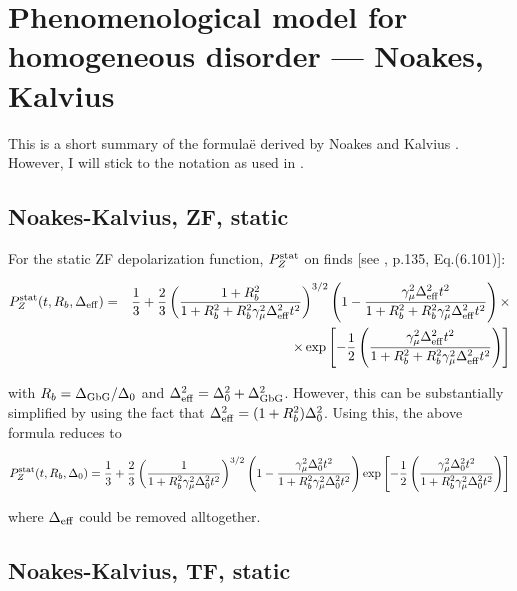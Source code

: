 \documentclass[a4paper,10pt]{article}
\begin{document}
\section*{Phenomenological model for homogeneous disorder --- Noakes, Kalvius}

\noindent This is a short summary of the formula\"{e} derived by Noakes and
Kalvius \cite{noakes97,noakes99}. However, I will stick to the notation as used
in \cite{yaouanc11}.

\subsection*{Noakes-Kalvius, ZF, static}

\noindent For the static ZF depolarization function, $P_{Z}^{\rm stat}$ on finds [see \cite{yaouanc11}, p.135, Eq.(6.101)]:

\begin{eqnarray*}
 P_{Z}^{\rm stat}(t, R_b, \Delta_{\rm eff}) &=& \frac{1}{3} + \frac{2}{3} \left(\frac{1+R_b^2}{1+R_b^2+R_b^2 \gamma_\mu^2 \Delta_{\rm eff}^2 t^2}\right)^{3/2}
  \left(1-\frac{\gamma_\mu^2 \Delta_{\rm eff}^2 t^2}{1+R_b^2+R_b^2\gamma_\mu^2 \Delta_{\rm eff}^2 t^2}\right) \times \\
 && \times \exp\left[-\frac{1}{2}\left(\frac{\gamma_\mu^2 \Delta_{\rm eff}^2 t^2}{1+R_b^2+R_b^2\gamma_\mu^2 \Delta_{\rm eff}^2 t^2}\right)\right]
\end{eqnarray*}

\noindent with $R_b = \Delta_{\rm GbG} / \Delta_0$ and $\Delta_{\rm eff}^2 = \Delta_0^2 + \Delta_{\rm GbG}^2$. However, this can be substantially simplified by 
using the fact that $\Delta_{\rm eff}^2 = (1+R_b^2) \Delta_0^2$. Using this, the above formula reduces to

\begin{equation}
 P_{Z}^{\rm stat}(t, R_b, \Delta_0) = \frac{1}{3} + \frac{2}{3} \left(\frac{1}{1+R_b^2 \gamma_\mu^2 \Delta_0^2 t^2}\right)^{3/2}
  \left(1 - \frac{\gamma_\mu^2 \Delta_0^2 t^2}{1+R_b^2 \gamma_\mu^2 \Delta_0^2 t^2}\right) 
  \exp\left[-\frac{1}{2}\left(\frac{\gamma_\mu^2 \Delta_0^2 t^2}{1+R_b^2\gamma_\mu^2 \Delta_0^2 t^2}\right)\right]
\end{equation}

\noindent where $\Delta_{\rm eff}$ could be removed alltogether.

\subsection*{Noakes-Kalvius, TF, static}
\end{document}

